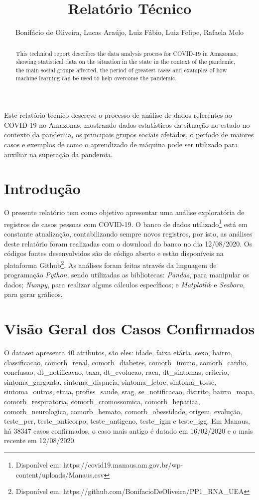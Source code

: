 \documentclass[12pt]{article}
\title{Relatório Técnico}
\author{Bonifácio de Oliveira, Lucas Araújo, Luiz Fábio, Luiz Felipe, Rafaela Melo }
\begin{document}
 

\maketitle

\begin{abstract}
This technical report describes the data analysis process for COVID-19 in Amazonas, showing statistical data on the situation in the state in the context of the pandemic, the main social groups affected, the period of greatest cases and examples of how machine learning can be used to help overcome the pandemic.
\end{abstract}
     
\begin{resumo} 
  Este relatório técnico descreve o processo de análise de dados referentes ao COVID-19 no Amazonas, mostrando dados estatísticos da situação no estado no contexto da pandemia, os principais grupos sociais afetados, o período de maiores casos e exemplos de como o aprendizado de máquina pode ser utilizado para auxiliar na superação da pandemia.
\end{resumo}

\section{Introdução}
O presente relatório tem como objetivo apresentar uma análise exploratória de registros de casos pessoas com COVID-19. O banco de dados utilizado\footnote{Disponível em: https://covid19.manaus.am.gov.br/wp-content/uploads/Manaus.csv} está em constante atualização, contabilizando sempre novos registros, por isto, as análises deste relatório foram realizadas com o download do banco no dia 12/08/2020. Os códigos fontes desenvolvidos são de código aberto e estão disponíveis na plataforma Github\footnote{Disponível em: https://github.com/BonifacioDeOliveira/PP1\_RNA\_UEA}. As análises foram feitas através da linguagem de programação \textit{Python}, sendo utilizadas as bibliotecas: \textit{Pandas}, para manipular os dados; \textit{Numpy}, para realizar alguns cálculos específicos; e \textit{Matplotlib} e \textit{Seaborn}, para gerar gráficos.

\section{Visão Geral dos Casos Confirmados}

O dataset apresenta 40 atributos, são eles: idade, faixa etária, sexo, bairro, classificacao, comorb\_renal, comorb\_diabetes, comorb\_imuno, comorb\_cardio, conclusao, dt\_notificacao, taxa, dt\_evolucao, raca, dt\_sintomas, criterio, sintoma\_garganta, sintoma\_dispneia, sintoma\_febre, sintoma\_tosse, sintoma\_outros, etnia, profiss\_saude, srag, se\_notificacao, distrito, bairro\_mapa, comorb\_respiratoria, comorb\_cromossomica, comorb\_hepatica, comorb\_neurologica, comorb\_hemato, comorb\_obessidade, origem, evolução, teste\_pcr, teste\_anticorpo, teste\_antigeno, teste\_igm e teste\_igg. Em Manaus, há 38347 casos confirmados, o caso mais antigo é datado em 16/02/2020 e o mais recente em 12/08/2020.
\end{document}
